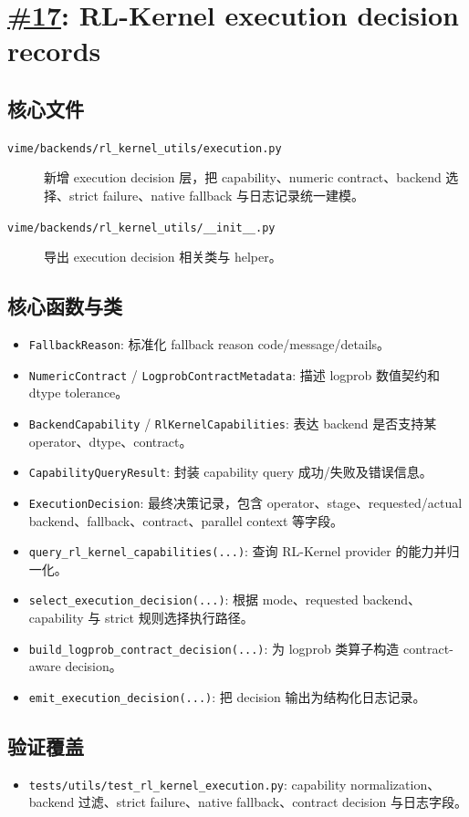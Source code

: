 \documentclass[11pt,a4paper]{ctexart}
\newcommand{\code}[1]{{\small\nolinkurl{#1}}}
\newcommand{\pr}[1]{\href{https://github.com/RL-Align/vime/pull/#1}{\##1}}
\newcommand{\fileitem}[2]{\item[\code{#1}] #2}
\begin{document}
\newpage
\section{\pr{17}: RL-Kernel execution decision records}

\subsection{核心文件}
\begin{description}
  \fileitem{vime/backends/rl_kernel_utils/execution.py}{新增 execution decision 层，把 capability、numeric contract、backend 选择、strict failure、native fallback 与日志记录统一建模。}
  \fileitem{vime/backends/rl_kernel_utils/__init__.py}{导出 execution decision 相关类与 helper。}
\end{description}

\subsection{核心函数与类}
\begin{itemize}
  \item \code{FallbackReason}: 标准化 fallback reason code/message/details。
  \item \code{NumericContract} / \code{LogprobContractMetadata}: 描述 logprob 数值契约和 dtype tolerance。
  \item \code{BackendCapability} / \code{RlKernelCapabilities}: 表达 backend 是否支持某 operator、dtype、contract。
  \item \code{CapabilityQueryResult}: 封装 capability query 成功/失败及错误信息。
  \item \code{ExecutionDecision}: 最终决策记录，包含 operator、stage、requested/actual backend、fallback、contract、parallel context 等字段。
  \item \code{query_rl_kernel_capabilities(...)}: 查询 RL-Kernel provider 的能力并归一化。
  \item \code{select_execution_decision(...)}: 根据 mode、requested backend、capability 与 strict 规则选择执行路径。
  \item \code{build_logprob_contract_decision(...)}: 为 logprob 类算子构造 contract-aware decision。
  \item \code{emit_execution_decision(...)}: 把 decision 输出为结构化日志记录。
\end{itemize}

\subsection{验证覆盖}
\begin{itemize}
  \item \code{tests/utils/test_rl_kernel_execution.py}: capability normalization、backend 过滤、strict failure、native fallback、contract decision 与日志字段。
\end{itemize}
\end{document}
